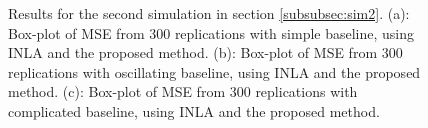 \documentclass[ba]{imsart}
\begin{document}
\begin{figure}[ht]
\centering
{}
\caption{Results for the second simulation in section \ref{subsubsec:sim2}. (a): Box-plot of MSE from 300 replications with simple baseline, using INLA and the proposed method. (b): Box-plot of MSE from 300 replications with oscillating baseline, using INLA and the proposed method. (c): Box-plot of MSE from 300 replications with complicated baseline, using INLA and the proposed method.}
\label{fig:SimAggBox}
\end{figure}
\end{document}
